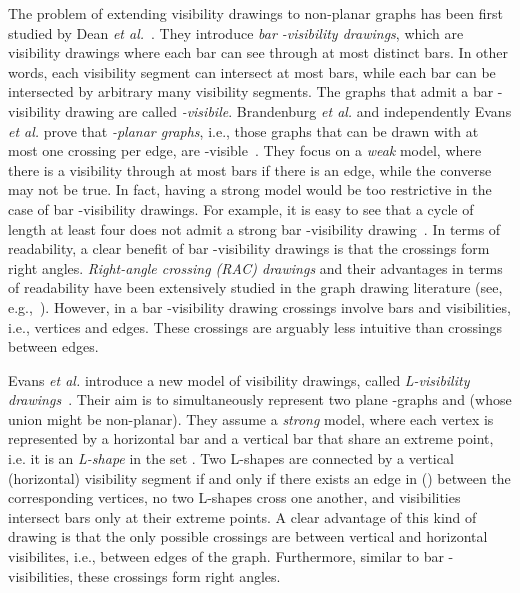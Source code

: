 \documentclass[a4paper]{article}
\newcommand{\shapes}{\xspace}
\begin{document}
The problem of extending visibility drawings to non-planar graphs has been first studied by Dean {\em et al.}~\cite{DBLP:journals/jgaa/DeanEGLST07}. They introduce \emph{bar -visibility drawings}, which are visibility drawings where each bar can see through at most  distinct bars. In other words, each visibility segment can intersect at most  bars, while each bar can be intersected by arbitrary many visibility segments. The graphs that admit a bar -visibility drawing are called \emph{-visibile}. Brandenburg {\em et al.} and independently Evans {\em et al.} prove that \emph{-planar graphs}, i.e., those graphs that can be drawn with at most one crossing per edge, are -visible~\cite{DBLP:journals/jgaa/Brandenburg14,DBLP:journals/jgaa/Evans0LMW14}. They focus on a \emph{weak} model, where there is a visibility through at most  bars if there is an edge, while the converse may not be true. In fact, having a strong model would be too restrictive in the case of bar -visibility drawings. For example, it is easy to see that a cycle of length at least four does not admit a strong bar -visibility drawing~\cite{DBLP:journals/jgaa/Brandenburg14}. In terms of readability, a clear benefit of bar -visibility drawings is that the crossings form right angles. \emph{Right-angle crossing (RAC) drawings} and their advantages in terms of readability have been extensively studied in the graph drawing literature (see, e.g.,~\cite{dl-cargd-12,DBLP:conf/apvis/HuangHE08}). However, in a bar -visibility drawing crossings involve bars and visibilities, i.e., vertices and edges. These crossings are arguably less intuitive than crossings between edges.

Evans {\em et al.} introduce a new model of visibility drawings, called {\em L-visibility drawings}~\cite{elm-svrp+-15}. Their aim is to simultaneously represent two plane -graphs  and  (whose union might be non-planar). They assume a {\em strong} model, where each vertex is represented by a horizontal bar and a vertical bar that share an extreme point, i.e. it is an {\em L-shape} in the set \shapes.  Two L-shapes are connected by a vertical (horizontal) visibility segment if and only if there exists an edge in  () between the corresponding vertices,  no two L-shapes cross one another, and visibilities intersect bars only at their extreme points. A clear advantage of this kind of drawing is that the only possible crossings are between vertical and horizontal visibilites, i.e., between edges of the graph. Furthermore, similar to bar -visibilities, these crossings form right angles. 
\end{document}
